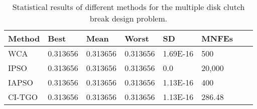 
\begin{table*}[tp]
    \tiny
    \begin{center}
    
    \begin{tabular}{ P{2.0cm} P{2.0cm} P{2.0cm} P{2.0cm} P{2.0cm} P{2.0cm} P{2.0cm} P{2.0cm}  }
    \hline
    \textbf{Method} & \textbf{Best} & \textbf{Mean} & \textbf{Worst} & \textbf{SD} & \textbf{MNFEs} \\
    \hline

    WCA & 0.313656 & 0.313656 & 0.313656 & 1.69E-16 & 500 \\
    IPSO & 0.313656 & 0.313656 & 0.313656 & 0.0 & 20,000 \\
    IAPSO & 0.313656 & 0.313656 & 0.313656 & 1.13E-16 & 400 \\
    CI-TGO & 0.313656 & 0.313656 & 0.313656 & 1.13E-16 & 286.48 \\

    \hline
    \end{tabular}
    \end{center}
    
    \caption{ Statistical results of different methods for the multiple disk clutch break design problem. \\[1em]}
    \label{tab:MD}
    \end{table*}
    
    